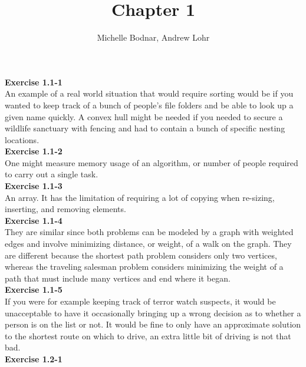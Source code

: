 \documentclass{article}
\title{Chapter 1}
\author{Michelle Bodnar, Andrew Lohr}
\begin{document}
\maketitle

\noindent\textbf{Exercise 1.1-1}\\

An example of a real world situation that would require sorting would be if you wanted to keep track of a bunch of people's file folders and be able to look up a given name quickly. A convex hull might be needed if you needed to secure a wildlife sanctuary with fencing and had to contain a bunch of specific nesting locations.\\



\noindent\textbf{Exercise 1.1-2}\\

One might measure memory usage of an algorithm, or number of people required to carry out a single task.\\


\noindent\textbf{Exercise 1.1-3} \\

An array. It has the limitation of requiring a lot of copying when re-sizing, inserting, and removing elements. \\

\noindent\textbf{Exercise 1.1-4} \\

They are similar since both problems can be modeled by a graph with weighted edges and involve minimizing distance, or weight, of a walk on the graph.  They are different because the shortest path problem considers only two vertices, whereas the traveling salesman problem considers minimizing the weight of a path that must include many vertices and end where it began. \\

\noindent\textbf{Exercise 1.1-5} \\

If you were for example keeping track of terror watch suspects, it would be unacceptable to have it occasionally bringing up a wrong decision as to whether a person is on the list or not. It would be fine to only have an approximate solution to the shortest route on which to drive, an extra little bit of driving is not that bad. \\

\noindent\textbf{Exercise 1.2-1} \\
\end{document}
